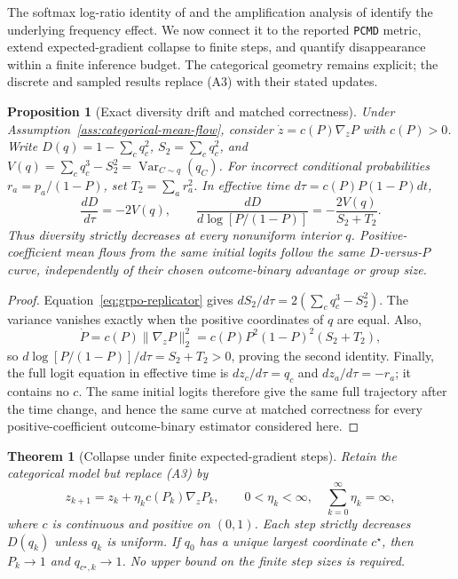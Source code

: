 \documentclass{article}
\newcommand{\enforcehalffinalproseline}{%
  \setlength{\parfillskip}{0pt plus .20\linewidth}}
\newcommand{\1}{\mathbf 1}
\newcommand{\pmd}{\texttt{PCMD}}
\newtheorem{theorem}[lemma]{Theorem}
\newtheorem{proposition}[lemma]{Proposition}
\theoremstyle{remark}
\theoremstyle{definition}
\theoremstyle{plain}
\begin{document}
The softmax log-ratio identity of
\citet[Theorem~3.1 and App.~A.1]{sinha2026expected} and the amplification
analysis of \citet[Section~4.2]{lochab2026ucpo} identify the underlying
frequency effect. We now connect it to the reported \pmd{} metric, extend
expected-gradient collapse to finite steps, and quantify disappearance within
a finite inference budget. The categorical geometry remains explicit;
the discrete and sampled results replace (A3) with their stated updates.

\begin{proposition}[Exact diversity drift and matched correctness]
\enforcehalffinalproseline
\label{prop:pcmd-drift}
Under Assumption~\ref{ass:categorical-mean-flow}, consider
$\dot z=c(P)\nabla_zP$ with $c(P)>0$. Write
$D(q)=1-\sum_cq_c^2$, $S_2=\sum_cq_c^2$, and
$V(q)=\sum_cq_c^3-S_2^2=\operatorname{Var}_{C\sim q}(q_C)$.
For incorrect conditional probabilities $r_a=p_a/(1-P)$, set
$T_2=\sum_ar_a^2$. In effective time $d\tau=c(P)P(1-P)dt$,
\begin{equation}
 \frac{dD}{d\tau}=-2V(q),
 \qquad
 \frac{dD}{d\log[P/(1-P)]}
 =-\frac{2V(q)}{S_2+T_2}.
 \label{eq:pcmd-drift}
\end{equation}
Thus diversity strictly decreases at every nonuniform interior $q$.
Positive-coefficient mean flows from the same initial logits follow the same
$D$-versus-$P$ curve, independently of their chosen outcome-binary advantage or
group size.
\end{proposition}

\begin{proof}
\enforcehalffinalproseline
Equation~\eqref{eq:grpo-replicator} gives
$dS_2/d\tau=2(\sum_cq_c^3-S_2^2)$. The variance vanishes exactly when the
positive coordinates of $q$ are equal. Also,
\[
 \dot P=c(P)\|\nabla_zP\|_2^2
       =c(P)P^2(1-P)^2(S_2+T_2),
\]
so $d\log[P/(1-P)]/d\tau=S_2+T_2>0$, proving the second identity.
Finally, the full logit equation in effective time is
$dz_c/d\tau=q_c$ and $dz_a/d\tau=-r_a$; it contains no $c$.
The same initial logits therefore give the same full trajectory after the
time change, and hence the same curve at matched correctness for every positive-coefficient outcome-binary estimator considered here.
\end{proof}

\begin{theorem}[Collapse under finite expected-gradient steps]
\enforcehalffinalproseline
\label{thm:finite-expected-steps}
Retain the categorical model but replace (A3) by
\begin{equation}
 z_{k+1}=z_k+\eta_k c(P_k)\nabla_zP_k,
 \qquad 0<\eta_k<\infty,\quad \sum_{k=0}^\infty\eta_k=\infty,
 \label{eq:finite-expected-update}
\end{equation}
where $c$ is continuous and positive on $(0,1)$. Each step strictly decreases
$D(q_k)$ unless $q_k$ is uniform. If $q_0$ has a unique largest coordinate
$c^\star$, then $P_k\to1$ and $q_{c^\star,k}\to1$.
No upper bound on the finite step sizes is required.
\end{theorem}
\end{document}
